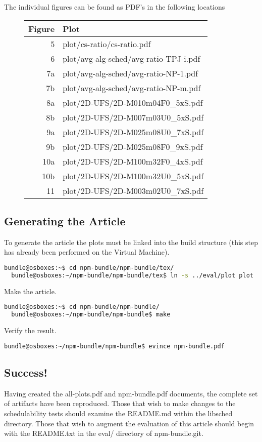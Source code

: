 \documentclass[a4paper]{article}
\begin{document}
{\noindent}The individual figures can be found as PDF's in the following
locations 
\begin{figure}[H]
  \begin{tabular}{r|l}
    Figure & Plot \\
    \hline
    5 & plot/cs-ratio/cs-ratio.pdf \\
    6 & plot/avg-alg-sched/avg-ratio-TPJ-i.pdf \\
    7a & plot/avg-alg-sched/avg-ratio-NP-1.pdf \\
    7b & plot/avg-alg-sched/avg-ratio-NP-m.pdf \\
    8a & plot/2D-UFS/2D-M010m04F0\_5xS.pdf \\
    8b & plot/2D-UFS/2D-M007m03U0\_5xS.pdf \\
    9a & plot/2D-UFS/2D-M025m08U0\_7xS.pdf \\
    9b & plot/2D-UFS/2D-M025m08F0\_9xS.pdf \\
    10a & plot/2D-UFS/2D-M100m32F0\_4xS.pdf \\
    10b & plot/2D-UFS/2D-M100m32U0\_5xS.pdf \\
    11 & plot/2D-UFS/2D-M003m02U0\_7xS.pdf
  \end{tabular}
\end{figure}

\subsection{Generating the Article}

To generate the article the plots must be linked into the build
structure (this step has already been performed on the Virtual
Machine).

\begin{lstlisting}[language=bash]
  bundle@osboxes:~$ cd npm-bundle/npm-bundle/tex/
  bundle@osboxes:~/npm-bundle/npm-bundle/tex$ ln -s ../eval/plot plot
\end{lstlisting}

{\noindent}Make the article.
\begin{lstlisting}[language=bash]
  bundle@osboxes:~$ cd npm-bundle/npm-bundle/
  bundle@osboxes:~/npm-bundle/npm-bundle$ make
\end{lstlisting}

{\noindent}Verify the result.
\begin{lstlisting}[language=bash]
  bundle@osboxes:~/npm-bundle/npm-bundle$ evince npm-bundle.pdf
\end{lstlisting}

\subsection{Success!}

Having created the all-plots.pdf and npm-bundle.pdf documents, the
complete set of artifacts have been reproduced. Those that wish to make
changes to the schedulability tests should examine the README.md
within the libsched directory. Those that wish to augment the
evaluation of this article should begin with the README.txt in the
eval/ directory of npm-bundle.git.
\end{document}
